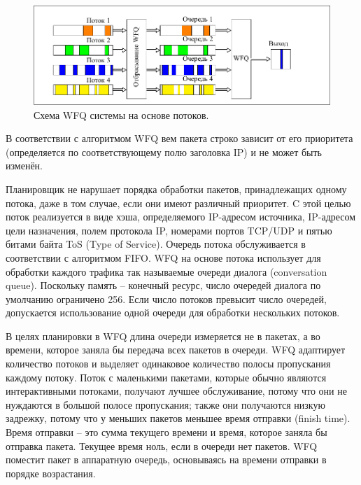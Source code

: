     \begin{figure}[ht!]
		\center
        \includegraphics[scale=1.1]{./pdfimages/fwfq.pdf}
        \caption{Схема WFQ системы на основе потоков.}
		\label{pic:fwfqscheme}
    \end{figure}

	В соответствии с алгоритмом WFQ вем пакета строко зависит от его приоритета
	(определяется по соответствующему полю заголовка IP) и не может быть изменён.

    Планировщик не нарушает порядка обработки пакетов,
    принадлежащих одному потока, даже в том случае, если они имеют различный приоритет.
    C этой целью поток реализуется в виде хэша, определяемого IP-адресом источника,
    IP-адресом цели назначения, полем протокола IP, номерами портов TCP/UDP и пятью
    битами байта ToS (Type of Service). Очередь потока обслуживается в соответствии с алгоритмом FIFO.
    WFQ на основе потока использует для обработки каждого трафика так называемые
    очереди диалога (conversation queue).
    Поскольку память -- конечный ресурс, число очередей диалога по умолчанию
    ограничено 256. Если число потоков превысит число очередей, допускается
    использование одной очереди для обработки нескольких потоков.\cite{Vagesna}

    В целях планировки в WFQ длина очереди измеряется не в пакетах, а во времени,
    которое заняла бы передача всех пакетов в очереди. WFQ адаптирует количество
    потоков и выделяет одинаковое количество полосы пропускания каждому потоку.
    Поток с маленькими пакетами, которые обычно являются интерактивными потоками,
    получают лучшее обслуживание, потому что они не нуждаются в большой полосе пропускания;
    также они получаются низкую задрежку, потому что у меньших пакетов меньшее
    время отправки (finish time). Время отправки -- это сумма текущего времени и
    время, которое заняла бы отправка пакета. Текущее время ноль, если в очереди
    нет пакетов. WFQ поместит пакет в аппаратную очередь, основываясь на времени отправки в
    порядке возрастания.\cite{Vagesna}
	
